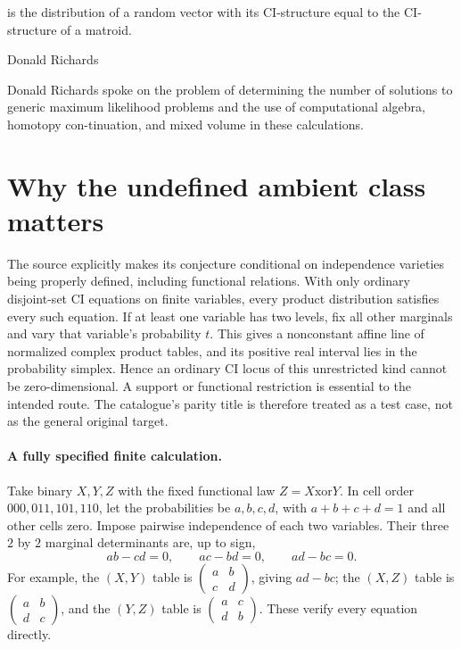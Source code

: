 \documentclass[11pt]{article}
\begin{document}
is the distribution of a random vector with its CI-structure equal to the CI-structure of a matroid.

Donald Richards

Donald Richards spoke on the problem of determining the number of solutions to generic maximum likelihood problems and the use of computational algebra, homotopy con-tinuation, and mixed volume in these calculations.

\section{Why the undefined ambient class matters}
The source explicitly makes its conjecture conditional on independence
varieties being properly defined, including functional relations. With
only ordinary disjoint-set CI equations on finite variables, every
product distribution satisfies every such equation. If at least one
variable has two levels, fix all other marginals and vary that variable's
probability $t$. This gives a nonconstant affine line of normalized
complex product tables, and its positive real interval lies in the
probability simplex. Hence an ordinary CI locus of this unrestricted
kind cannot be zero-dimensional. A support or functional restriction
is essential to the intended route. The catalogue's parity title is
therefore treated as a test case, not as the general original target.

\paragraph{A fully specified finite calculation.}
Take binary $X,Y,Z$ with the fixed functional law
$Z=X\mathbin{\mathrm{xor}}Y$. In cell order $000,011,101,110$, let
the probabilities be $a,b,c,d$, with $a+b+c+d=1$ and all other cells
zero. Impose pairwise independence of each two variables. Their three
$2$ by $2$ marginal determinants are, up to sign,
\[
 ab-cd=0,\qquad ac-bd=0,\qquad ad-bc=0.
\]
For example, the $(X,Y)$ table is
$\left(\begin{smallmatrix}a&b\\c&d\end{smallmatrix}\right)$,
giving $ad-bc$; the $(X,Z)$ table is
$\left(\begin{smallmatrix}a&b\\d&c\end{smallmatrix}\right)$,
and the $(Y,Z)$ table is
$\left(\begin{smallmatrix}a&c\\d&b\end{smallmatrix}\right)$.
These verify every equation directly.
\end{document}
